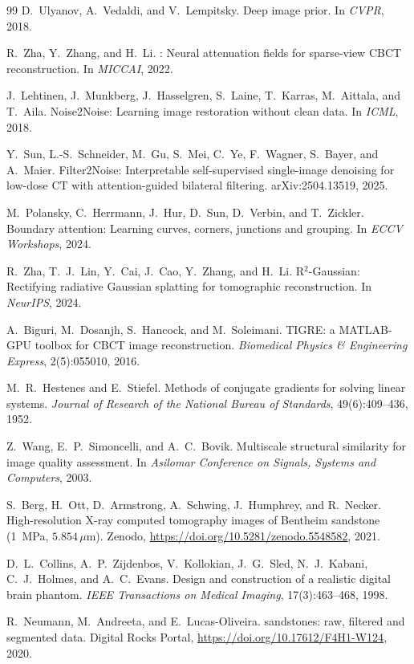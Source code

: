 \documentclass[11pt]{article}
\begin{document}
\begin{thebibliography}{99}
D.~Ulyanov, A.~Vedaldi, and V.~Lempitsky.
\newblock Deep image prior.
\newblock In \emph{CVPR}, 2018.

R.~Zha, Y.~Zhang, and H.~Li.
: Neural attenuation fields for sparse-view {CBCT}
reconstruction.
\newblock In \emph{MICCAI}, 2022.

J.~Lehtinen, J.~Munkberg, J.~Hasselgren, S.~Laine, T.~Karras, M.~Aittala,
and T.~Aila.
\newblock Noise2Noise: Learning image restoration without clean data.
\newblock In \emph{ICML}, 2018.

Y.~Sun, L.-S.~Schneider, M.~Gu, S.~Mei, C.~Ye, F.~Wagner, S.~Bayer, and
A.~Maier.
\newblock Filter2Noise: Interpretable self-supervised single-image
denoising for low-dose {CT} with attention-guided bilateral filtering.
\newblock arXiv:2504.13519, 2025.

M.~Polansky, C.~Herrmann, J.~Hur, D.~Sun, D.~Verbin, and T.~Zickler.
\newblock Boundary attention: Learning curves, corners, junctions and grouping.
\newblock In \emph{ECCV Workshops}, 2024.

R.~Zha, T.~J.~Lin, Y.~Cai, J.~Cao, Y.~Zhang, and H.~Li.
\newblock R$^2$-Gaussian: Rectifying radiative Gaussian splatting for
tomographic reconstruction.
\newblock In \emph{NeurIPS}, 2024.

A.~Biguri, M.~Dosanjh, S.~Hancock, and M.~Soleimani.
\newblock TIGRE: a MATLAB-GPU toolbox for CBCT image reconstruction.
\newblock \emph{Biomedical Physics \& Engineering Express}, 2(5):055010, 2016.

M.~R.~Hestenes and E.~Stiefel.
\newblock Methods of conjugate gradients for solving linear systems.
\newblock \emph{Journal of Research of the National Bureau of Standards},
49(6):409--436, 1952.

Z.~Wang, E.~P.~Simoncelli, and A.~C.~Bovik.
\newblock Multiscale structural similarity for image quality assessment.
\newblock In \emph{Asilomar Conference on Signals, Systems and Computers}, 2003.

S.~Berg, H.~Ott, D.~Armstrong, A.~Schwing, J.~Humphrey, and R.~Necker.
\newblock High-resolution X-ray computed tomography images of Bentheim
sandstone (1~MPa, $5.854\,\mu\mathrm{m}$).
\newblock Zenodo, \url{https://doi.org/10.5281/zenodo.5548582}, 2021.

D.~L.~Collins, A.~P.~Zijdenbos, V.~Kollokian, J.~G.~Sled, N.~J.~Kabani,
C.~J.~Holmes, and A.~C.~Evans.
\newblock Design and construction of a realistic digital brain phantom.
\newblock \emph{IEEE Transactions on Medical Imaging}, 17(3):463--468, 1998.

R.~Neumann, M.~Andreeta, and E.~Lucas-Oliveira.
 sandstones: raw, filtered and segmented data.
\newblock Digital Rocks Portal, \url{https://doi.org/10.17612/F4H1-W124}, 2020.

\end{thebibliography}
\end{document}
